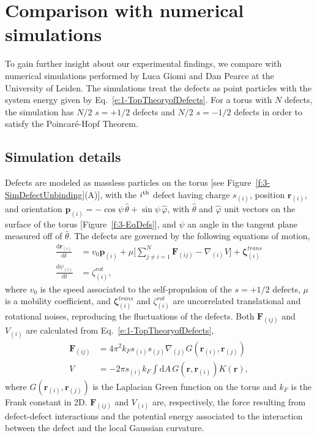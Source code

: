 \section{Comparison with numerical simulations}
To gain further insight about our experimental findings, we compare with numerical simulations performed by Luca Giomi and Dan Pearce at the University of Leiden.
The simulations treat the defects as point particles with the system energy given by Eq.~\ref{e:1-TopTheoryofDefects}.
For a torus with $N$ defects, the simulation has $N/2$ $s = +1/2$ defects and $N/2$ $s = -1/2$ defects in order to satisfy the Poincar\'e-Hopf Theorem.


\subsection{Simulation details}
Defects are modeled as massless particles on the torus [see Figure~\ref{f:3-SimDefectUnbinding}(A)], with the $i^{\rm th}$ defect having charge $s_{(i)}$, position $\mathbf{r}_{(i)}$, and orientation $\mathbf{p}_{(i)} = -\cos \psi \, \hat{\theta} + \sin \psi \, \hat{\varphi}$, with $\hat{\theta}$ and $\hat{\varphi}$ unit vectors on the surface of the torus [Figure~\ref{f:3-EqDefs}], and $\psi$ an angle in the tangent plane measured off of $\hat{\theta}$.
The defects are governed by the following equations of motion,
\begin{align}
  \frac{\textrm{d}\mathbf{r}_{(i)}}{\textrm{d}t} &= v_0 \mathbf{p}_{(i)} + \mu \Big [\sum\limits_{j\neq i=1}^N \mathbf{F}_{(ij)} - \nabla_{(i)} V \Big ] + \bm{\zeta}^{trans}_{(i)} \\
    \frac{\textrm{d}\psi_{(i)}}{\textrm{d}t} &= \zeta^{rot}_{(i)},
\end{align}
where $v_0$ is the speed associated to the self-propulsion of the $s = +1/2$ defects, $\mu$ is a mobility coefficient, and $\bm{\zeta}^{trans}_{(i)}$ and $\zeta^{rot}_{(i)}$ are uncorrelated translational and rotational noises, reproducing the fluctuations of the defects\cite{uncorrelatedNoise}.
Both $\mathbf{F}_{(ij)}$ and $V_{(i)}$ are calculated from Eq.~\ref{e:1-TopTheoryofDefects},
\begin{align}
  \mathbf{F}_{(ij)} &= 4\pi^2 k_F s_{(i)}s_{(j)} \nabla_{(j)} G(\mathbf{r}_{(i)},\mathbf{r}_{(j)})\label{e:defectdefectforce} \\
  V &= - 2 \pi s_{(i)}k_F \int \textrm{d}A\, G(\mathbf{r},\mathbf{r}_{(i)})K(\mathbf{r}),\label{e:defectsurfaceenergy}
\end{align}
where $G(\mathbf{r}_{(i)},\mathbf{r}_{(j)})$ is the Laplacian Green function on the torus and $k_F$ is the Frank constant in 2D.
$\mathbf{F}_{(ij)}$ and $V_{(i)}$ are, respectively, the force resulting from defect-defect interactions and the potential energy associated to the interaction between the defect and the local Gaussian curvature.

